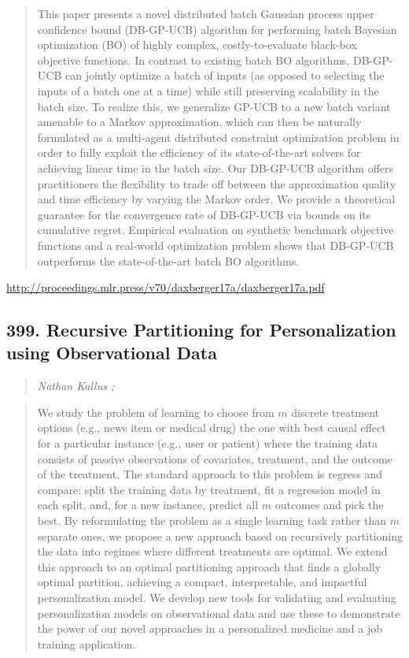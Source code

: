 \documentclass{article}
\begin{document}
\begin{quote}
    This paper presents a novel distributed batch Gaussian process upper confidence bound (DB-GP-UCB) algorithm for performing batch Bayesian optimization (BO) of highly complex, costly-to-evaluate black-box objective functions. In contrast to existing batch BO algorithms, DB-GP-UCB can jointly optimize a batch of inputs (as opposed to selecting the inputs of a batch one at a time) while still preserving scalability in the batch size. To realize this, we generalize GP-UCB to a new batch variant amenable to a Markov approximation, which can then be naturally formulated as a multi-agent distributed constraint optimization problem in order to fully exploit the efficiency of its state-of-the-art solvers for achieving linear time in the batch size. Our DB-GP-UCB algorithm offers practitioners the flexibility to trade off between the approximation quality and time efficiency by varying the Markov order. We provide a theoretical guarantee for the convergence rate of DB-GP-UCB via bounds on its cumulative regret. Empirical evaluation on synthetic benchmark objective functions and a real-world optimization problem shows that DB-GP-UCB outperforms the state-of-the-art batch BO algorithms.  
\end{quote}

\href{http://proceedings.mlr.press/v70/daxberger17a/daxberger17a.pdf}{http://proceedings.mlr.press/v70/daxberger17a/daxberger17a.pdf}

\subsection{399. Recursive Partitioning for Personalization using Observational Data}

\begin{quote}
\footnotesize{\textit{Nathan Kallus ;}}

\end{quote}

\begin{quote}
    We study the problem of learning to choose from $m$ discrete treatment options (e.g., news item or medical drug) the one with best causal effect for a particular instance (e.g., user or patient) where the training data consists of passive observations of covariates, treatment, and the outcome of the treatment. The standard approach to this problem is regress and compare: split the training data by treatment, fit a regression model in each split, and, for a new instance, predict all $m$ outcomes and pick the best. By reformulating the problem as a single learning task rather than $m$ separate ones, we propose a new approach based on recursively partitioning the data into regimes where different treatments are optimal. We extend this approach to an optimal partitioning approach that finds a globally optimal partition, achieving a compact, interpretable, and impactful personalization model. We develop new tools for validating and evaluating personalization models on observational data and use these to demonstrate the power of our novel approaches in a personalized medicine and a job training application.  
\end{quote}
\end{document}
